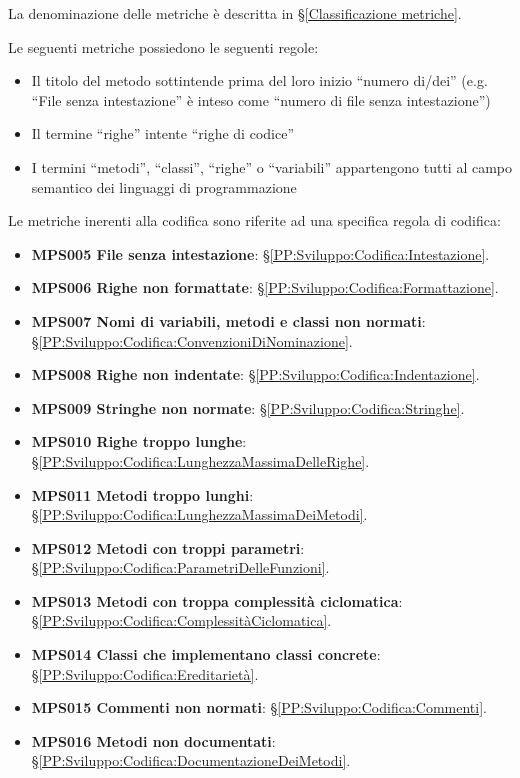         La denominazione delle metriche è descritta in \S\ref{Classificazione metriche}.

        Le seguenti metriche possiedono le seguenti regole:
        \begin{itemize}
            \item Il titolo del metodo sottintende prima del loro inizio ``numero di/dei'' (e.g. ``File senza intestazione'' è inteso come ``numero di file senza intestazione'')
            \item Il termine ``righe'' intente ``righe di codice''
            \item I termini ``metodi'', ``classi'', ``righe'' o ``variabili'' appartengono tutti al campo semantico dei linguaggi di programmazione
        \end{itemize}

        Le metriche inerenti alla codifica sono riferite ad una specifica regola di codifica:
        \begin{itemize}
            \item \textbf{MPS005 File senza intestazione}: \S\ref{PP:Sviluppo:Codifica:Intestazione}.
            \item \textbf{MPS006 Righe non formattate}: \S\ref{PP:Sviluppo:Codifica:Formattazione}.
            \item \textbf{MPS007 Nomi di variabili, metodi e classi non normati}: \S\ref{PP:Sviluppo:Codifica:ConvenzioniDiNominazione}.
            \item \textbf{MPS008 Righe non indentate}: \S\ref{PP:Sviluppo:Codifica:Indentazione}.
            \item \textbf{MPS009 Stringhe non normate}: \S\ref{PP:Sviluppo:Codifica:Stringhe}.
            \item \textbf{MPS010 Righe troppo lunghe}: \S\ref{PP:Sviluppo:Codifica:LunghezzaMassimaDelleRighe}.
            \item \textbf{MPS011 Metodi troppo lunghi}: \S\ref{PP:Sviluppo:Codifica:LunghezzaMassimaDeiMetodi}.
            \item \textbf{MPS012 Metodi con troppi parametri}: \S\ref{PP:Sviluppo:Codifica:ParametriDelleFunzioni}.
            \item \textbf{MPS013 Metodi con troppa complessità ciclomatica}: \S\ref{PP:Sviluppo:Codifica:ComplessitàCiclomatica}.
            \item \textbf{MPS014 Classi che implementano classi concrete}: \S\ref{PP:Sviluppo:Codifica:Ereditarietà}.
            \item \textbf{MPS015 Commenti non normati}: \S\ref{PP:Sviluppo:Codifica:Commenti}.
            \item \textbf{MPS016 Metodi non documentati}: \S\ref{PP:Sviluppo:Codifica:DocumentazioneDeiMetodi}.
        \end{itemize}

